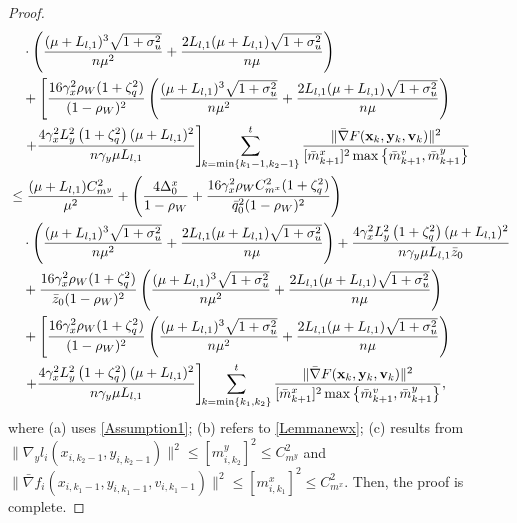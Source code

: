 \documentclass{article}
\theoremstyle{plain}
\theoremstyle{definition}
\theoremstyle{remark}
\begin{document}
\begin{proof}
\begin{align}
&\quad\cdot\left(\frac{(\mu+L_{l,1})^3\sqrt{1+\sigma_u^2}}{n\mu^2 }+\frac{2L_{l,1}(\mu+L_{l,1})\sqrt{1+\sigma_u^2}}{n\mu }\right) \nonumber\\
&\quad+ \left[\frac{16 \gamma_x^2 \rho_W(1 + \zeta_q^2)}{(1 - \rho_W)^2} \left(\frac{(\mu+L_{l,1})^3\sqrt{1+\sigma_u^2}}{n\mu^2}+\frac{2L_{l,1}(\mu+L_{l,1})\sqrt{1+\sigma_u^2}}{n\mu }\right)\right.\nonumber\\
&\quad\left.+\frac{4\gamma_x^2  L_y^2\left( 1 + \zeta_q^2 \right) (\mu + L_{l,1})^2}{n\gamma_y\mu L_{l,1}}\right]\!\! \sum_{k=\min\{k_1-1,k_2-1\}}^t \frac{\|\bar{\nabla} F(\mathbf{x}_k,\mathbf{y}_k,\mathbf{v}_k)\|^2}{[\bar{m}^x_{k+1}]^2\max \big\{\bar{m}^v_{k+1}, \bar{m}^y_{k+1}\big\}} \nonumber\\
&\leq \frac{(\mu + L_{l,1}) C_{m^y}^2}{\mu^2} +\left(\frac{4\Delta_0^x}{1-\rho_W}+\frac{16 \gamma_x^2 \rho_WC_{m^x}^2 (1 + \zeta_q^2)}{\bar{q}_0^2(1 - \rho_W)^2} \right)\notag\\
&\quad\cdot\left(\frac{(\mu+L_{l,1})^3\sqrt{1+\sigma_u^2}}{n\mu^2 }+\frac{2L_{l,1}(\mu+L_{l,1})\sqrt{1+\sigma_u^2}}{n\mu }\right)+\frac{4\gamma_x^2  L_y^2\left( 1 + \zeta_q^2 \right) (\mu + L_{l,1})^2}{n\gamma_y\mu L_{l,1}\bar{z}_0} \nonumber\\
&\quad+ \frac{16 \gamma_x^2 \rho_W(1 + \zeta_q^2)}{\bar{z}_0(1 - \rho_W)^2} \left(\frac{(\mu+L_{l,1})^3\sqrt{1+\sigma_u^2}}{n\mu^2}+\frac{2L_{l,1}(\mu+L_{l,1})\sqrt{1+\sigma_u^2}}{n\mu }\right)\nonumber\\
&\quad+ \left[\frac{16 \gamma_x^2 \rho_W(1 + \zeta_q^2)}{(1 - \rho_W)^2} \left(\frac{(\mu+L_{l,1})^3\sqrt{1+\sigma_u^2}}{n\mu^2}+\frac{2L_{l,1}(\mu+L_{l,1})\sqrt{1+\sigma_u^2}}{n\mu}\right)\right.\nonumber\\
&\quad\left.+\frac{4\gamma_x^2  L_y^2\left( 1 + \zeta_q^2 \right) (\mu + L_{l,1})^2}{n\gamma_y\mu L_{l,1}}\right]\!\! \sum_{k=\min\{k_1,k_2\}}^t \frac{\|\bar{\nabla} F(\mathbf{x}_k,\mathbf{y}_k,\mathbf{v}_k)\|^2}{[\bar{m}^x_{k+1}]^2\max \big\{\bar{m}^v_{k+1}, \bar{m}^y_{k+1}\big\}},\label{eq67}
\end{align}
where (a) uses \cref{Assumption1}; (b) refers to \cref{Lemmanewx}; (c) results from \(\|\nabla_y l_i({x}_{i,k_2-1}, {y}_{i,k_2-1})\|^2 \leq [m^y_{i,k_2}]^2 \leq C_{m^y}^2\) and \(\|\bar{\nabla} f_i({x}_{i,k_1-1}, {y}_{i,k_1-1},{v}_{i,k_1-1})\|^2 \leq [m^x_{i,k_1}]^2 \leq C_{m^x}^2\). Then, the proof is complete.
\end{proof}
\end{document}
